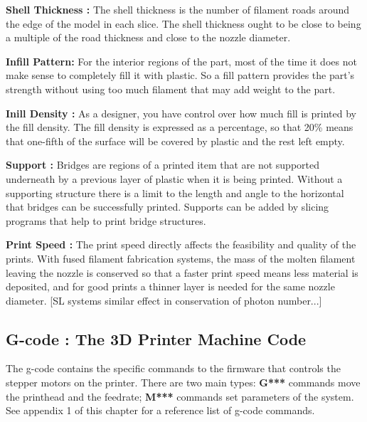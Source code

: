 \textbf{Shell Thickness :} The shell thickness is the number of filament roads around the edge of the model in each slice. The shell thickness ought to be close to being a multiple of the road thickness and close to the nozzle diameter. 

\textbf{Infill Pattern:} For the interior regions of the part, most of the time it does not make sense to completely fill it with plastic. So a fill pattern provides the part's strength without using too much filament that may add weight to the part. 

\textbf{Inill Density :}  As a designer, you have control over how much fill is printed by the fill density. The fill density is expressed as a percentage, so that 20\% means that one-fifth of the surface will be covered by plastic and the rest left empty. 

\textbf{Support :} Bridges are regions of a printed item that are not supported underneath by a previous layer of plastic when it is being printed. Without a supporting structure there is a limit to the length and angle to the horizontal that bridges can be successfully printed. Supports can be added by slicing programs that help to print bridge structures. 

\textbf{Print Speed :} The print speed directly affects the feasibility and quality of the prints. With fused filament fabrication systems, the mass of the molten filament leaving the nozzle is conserved so that a faster print speed means less material is deposited, and for good prints a thinner layer is needed for the same nozzle diameter. [SL systems similar effect in conservation of photon number...]

\subsection{G-code : The 3D Printer Machine Code}

The g-code contains the specific commands to the firmware that controls the stepper motors on the printer. There are two main types: \textbf{G***} commands move the printhead and the feedrate; \textbf{M***} commands set parameters of the system. See appendix 1 of this chapter for a reference list of g-code commands. 

